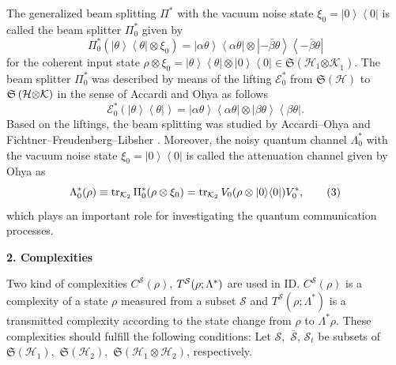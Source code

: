 The generalized beam splitting  $  \Pi ^{\ast } $   with the vacuum noise state  $  %
\xi _{0}=\left\vert 0\right\rangle \left\langle 0\right\vert  $   is called the
beam splitter  $  \Pi _{0}^{\ast } $   given by 
\[
\Pi _{0}^{\ast }\left( \left\vert \theta \right\rangle \left\langle \theta
\right\vert \otimes \xi _{0}\right) =\left\vert \alpha \theta \right\rangle
\left\langle \alpha \theta \right\vert \otimes \left\vert-\bar{\beta}\theta
\right\rangle \left\langle-\bar{\beta}\theta \right\vert 
\]%
for the coherent input state  $  \rho \otimes \xi _{0}=\left\vert \theta
\right\rangle \left\langle \theta \right\vert \otimes \left\vert
0\right\rangle \left\langle 0\right\vert \in \mathfrak{S}\left( \mathcal{H}%
_{1}{\otimes \mathcal{K}}_{1}\right)  $. The beam splitter  $  \Pi _{0}^{\ast } $  
was described by means of the lifting  $  \mathcal{E}_{0}^{\ast } $   from  $  %
\mathfrak{S}\left( \mathcal{H}\right)  $   to  $  \mathfrak{S}\left( \mathcal{H}{%
\otimes \mathcal{K}}\right)  $   in the sense of Accardi and Ohya \cite{nv:-AL} as
follows 
\[
\mathcal{E}_{0}^{\ast }\left( \left\vert \theta \right\rangle \left\langle
\theta \right\vert \right) =\left\vert \alpha \theta \right\rangle
\left\langle \alpha \theta \right\vert \otimes \left\vert \beta \theta
\right\rangle \left\langle \beta \theta \right\vert. 
\]%
Based on the liftings, the beam splitting was studied by Accardi--Ohya and
Ficht\-ner--Freudenberg--Libsher \cite{nv:-FFL}.   Moreover, the noisy quantum
channel  $  \Lambda _{0}^{\ast } $   with the vacuum noise state  $  \xi
_{0}=\left\vert 0\right\rangle \left\langle 0\right\vert  $   is called the
attenuation channel given by Ohya \cite{nv:-O1} as 
\begin{equation}
\Lambda _{0}^{\ast }(\rho )\equiv \mathop{\rm tr}\nolimits_{\mathcal{K}_{2}}\Pi _{0}^{\ast }(\rho
\otimes \xi _{0})=\mathop{\rm tr}\nolimits_{\mathcal{K}_{2}}V_{0}(\rho \otimes |0\rangle \langle
0|)V_{0}^{\ast },
\tag{3}
\end{equation}%
which plays an important role for investigating the quantum communication
processes.

\smallskip

\textbf{2. Complexities}

Two kind of complexities  $  C^{\mathcal{S}}( \rho)  $,    $  T^{\mathcal{%
S}}( \rho ; \Lambda ^{\ast } )  $   are used in ID.  $  C^{\mathcal{S}%
}( \rho)  $   is a comple\-xity of a state  $  \rho  $   measured from a
subset  $  \mathcal{S} $   and  $  T^{\mathcal{S}}\left( \rho {;\Lambda ^{\ast }}%
\right)  $   is a transmitted complexity according to the state change from  $  %
\rho  $   to  $  \Lambda ^{\ast }\rho  $. These complexities should fulfill the
following conditions:   Let  $  \mathcal{S}, $    $  \overline{\mathcal{S}} $,    $  \mathcal{S%
}_{t} $   be subsets of  $  \mathfrak{S}\left( \mathcal{H}_{1}\right),  $    $  %
\mathfrak{S}\left( \mathcal{H}_{2}\right),  $    $  \mathfrak{S}\left( \mathcal{H}%
_{1}\otimes \mathcal{H}_{2}\right) $,   respectively.

